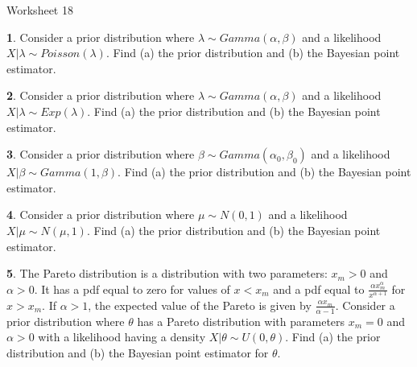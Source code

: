 \documentclass{tufte-handout}
\begin{document}
\justify

{\LARGE Worksheet 18}

\vspace*{18pt}


\textbf{1}. Consider a prior distribution where $\lambda \sim Gamma(\alpha, \beta)$ and a 
likelihood $X|\lambda \sim Poisson(\lambda)$. Find (a) the prior distribution
and (b) the Bayesian point estimator.

\textbf{2}. Consider a prior distribution where $\lambda \sim Gamma(\alpha, \beta)$ and a 
likelihood $X|\lambda \sim Exp(\lambda)$. Find (a) the prior distribution
and (b) the Bayesian point estimator.

\textbf{3}. Consider a prior distribution where $\beta \sim Gamma(\alpha_0, \beta_0)$ and a 
likelihood $X|\beta \sim Gamma(1, \beta)$. Find (a) the prior distribution
and (b) the Bayesian point estimator.

\textbf{4}. Consider a prior distribution where $\mu \sim N(0, 1)$ and a 
likelihood $X|\mu \sim N(\mu, 1)$. Find (a) the prior distribution
and (b) the Bayesian point estimator.

\textbf{5}. The Pareto distribution is a distribution with two parameters:
$x_m>0$ and $\alpha > 0$. It has a pdf equal to zero for values of $x < x_m$
and a pdf equal to $\frac{\alpha x_m^\alpha}{x^{\alpha + 1}}$ for $x > x_m$.
If $\alpha > 1$, the expected value of the Pareto is given by
$\frac{\alpha x_m}{\alpha - 1}$. Consider a prior distribution where $\theta$
has a Pareto distribution with parameters $x_m=0$ and $\alpha > 0$ with a
likelihood having a density $X|\theta \sim U(0, \theta)$.
Find (a) the prior distribution and (b) the Bayesian point estimator for $\theta$.
\end{document}
